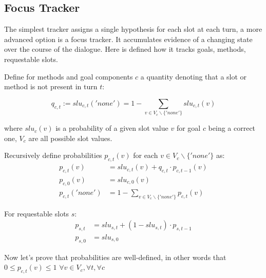\documentclass[12pt,titlepage,a4paper]{article}
\begin{document}
\subsection{Focus Tracker}

The simplest tracker assigns a single hypothesis for each slot at each turn, a more advanced option is a focus tracker. It accumulates evidence of a changing state over the course of the dialogue. Here is defined how it tracks goals, methods, requestable slots. 

Define for methods and goal components $c$ a quantity denoting that a slot or method is not present in turn $t$:

\begin{equation}
    \label{eqn:q_c_t}
    q_{c,t} := slu_{c,t}('none') = 1 - \sum_{v \in V_c \backslash \{'none'\}}slu_{c,t}(v)
\end{equation}

\noindent where $slu_c(v)$ is a probability of a given slot value $v$ for goal $c$ be\-ing a correct one, $V_c$ are all possible slot values.

Recursively define probabilities $p_{c,t}(v)$ for each $v \in V_c \backslash \{'none'\}$ as: 
\begin{align}
    \label{eqn:p_c_t}
    p_{c,t}(v) &=slu_{c,t}(v) + q_{c,t} \cdot p_{c,t-1}(v) \\
    \label{eqn:p_c_0}
    p_{c,0}(v) &= slu_{c,0}(v) \\
    \label{eqn:p_c_t_none}
    p_{c,t}('none') &= 1 - \sum_{v \in V_c \backslash \{'none'\}}p_{c,t}(v)
\end{align}

For requestable slots $s$: 
\begin{align}
    \label{eqn:p_s_t}
    p_{s,t} &= slu_{s,t} + (1 - slu_{s, t})\cdot p_{s,t-1} \\
    \label{eqn:p_s_0}
    p_{s,0} &= slu_{s,0}
\end{align}

Now let's prove that probabilities are well-defined, in other words that $0 \leq p_{c,t}(v) \leq 1$ $\forall v \in V_c, \forall t, \forall c$
\end{document}
